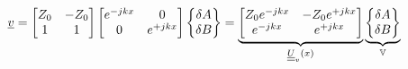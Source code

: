 \begin{equation}
    \underline{v} =
    \begin{bmatrix}
        Z_0 & -Z_0\\
        1 & 1
    \end{bmatrix}
    \begin{bmatrix}
        e^{-jkx} & 0\\
        0 & e^{+jkx}
    \end{bmatrix}
    \begin{Bmatrix}
        \delta A\\\delta B
    \end{Bmatrix}
    =
    \underbrace{
    \begin{bmatrix}
        Z_0e^{-jkx} & -Z_0e^{+jkx}\\
        e^{-jkx} & e^{+jkx}
    \end{bmatrix}}_{\underline{\underline{U}}_v(x)}
    \underbrace{\begin{Bmatrix}
        \delta A\\\delta B
    \end{Bmatrix}}_{\mathbb{V}}
\end{equation}
